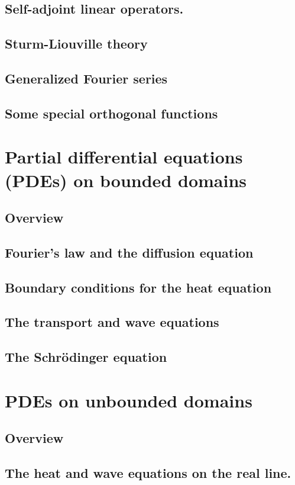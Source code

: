 \documentclass{article}
\begin{document}
\subsection{Self-adjoint linear operators.}
\subsection{Sturm-Liouville theory}
\subsection{Generalized Fourier series}
\subsection{Some special orthogonal functions}
\pagebreak
\section{Partial differential equations (PDEs) on bounded domains}
\subsection*{Overview}
\subsection{Fourier's law and the diffusion equation}
\subsection{Boundary conditions for the heat equation}
\subsection{The transport and wave equations}
\subsection{The Schrödinger equation}
\pagebreak
\section{PDEs on unbounded domains}
\subsection*{Overview}
\subsection{The heat and wave equations on the real line.}
\end{document}
